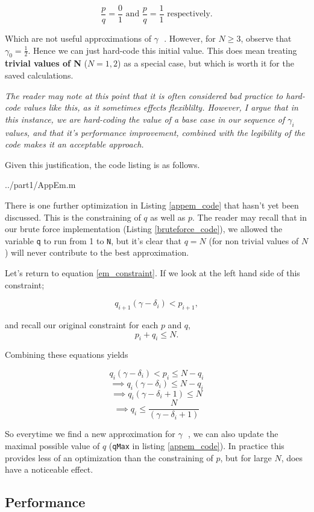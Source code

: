 \documentclass[10pt]{article}
\newcommand*{\gam}{$\gamma \text{ }$}
\newcommand*{\gami}{$\gamma_{i}$}
\begin{document}
$$ \frac{p}{q} = \frac{0}{1} \text{  and  }  \frac{p}{q} = \frac{1}{ 1} \text{ respectively}. $$

Which are not useful approximations of \gam.
 However, for $N \geq 3$, observe that $\gamma_0 = \frac{1}{2}$. Hence we can just hard-code this initial value. This does mean treating \textbf{trivial values of N} ($N = 1,2$) as a special case, but which is worth it for the saved calculations.

\emph{The reader may note at this point that it is often considered bad practice to hard-code values like this, as it sometimes effects flexiblilty. However, I argue that in this instance, we are hard-coding the value of a base case in our sequence of \gami $ $ values, and that it's performance improvement, combined with the legibility of the code makes it an acceptable approach.}

Given this justification, the code listing is as follows.

   {../part1/AppEm.m}

There is one further optimization in Listing \ref{appem_code} that hasn't yet been discussed. This is the constraining of $q$ as well as $p$. The reader may recall that in our brute force implementation (Listing \ref{bruteforce_code}), we allowed the variable \texttt{q} to run from 1 to \texttt{N}, but it's clear that $q = N$ (for non trivial values of $N$) will never contribute to the best approximation.

Let's return to equation \ref{em_constraint}. If we look at the left hand side of this constraint;

$$q_{i+1} (\gamma - \delta_i) < p_{i+1} ,$$

and recall our original constraint for each $p$ and $q$,
$$ p_i + q_i \leq N .$$

Combining these equations yields

$$ q_i (\gamma - \delta_i) < p_i \leq N - q_i $$ 
$$ \implies  q_i (\gamma - \delta_i) \leq N - q_i $$ 
$$ \implies q_i (\gamma - \delta_i + 1) \leq N  $$ 
$$ \implies q_i  \leq \frac{N}{(\gamma - \delta_i + 1)}  $$ 

So everytime we find a new approximation for \gam, we can also update the maximal possible value of $q$ (\texttt{qMax} in listing \ref{appem_code}). In practice this provides less of an optimization than the constraining of $p$, but for large $N$, does have a noticeable effect.

\subsection{Performance}
\end{document}
